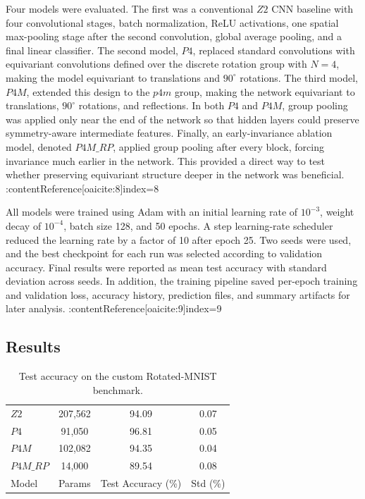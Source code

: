 \documentclass{article}
\begin{document}
Four models were evaluated. The first was a conventional $Z2$ CNN baseline with four convolutional stages, batch normalization, ReLU activations, one spatial max-pooling stage after the second convolution, global average pooling, and a final linear classifier. The second model, $P4$, replaced standard convolutions with equivariant convolutions defined over the discrete rotation group with $N=4$, making the model equivariant to translations and $90^\circ$ rotations. The third model, $P4M$, extended this design to the $p4m$ group, making the network equivariant to translations, $90^\circ$ rotations, and reflections. In both $P4$ and $P4M$, group pooling was applied only near the end of the network so that hidden layers could preserve symmetry-aware intermediate features. Finally, an early-invariance ablation model, denoted $P4M\_RP$, applied group pooling after every block, forcing invariance much earlier in the network. This provided a direct way to test whether preserving equivariant structure deeper in the network was beneficial. :contentReference[oaicite:8]{index=8}

All models were trained using Adam with an initial learning rate of $10^{-3}$, weight decay of $10^{-4}$, batch size 128, and 50 epochs. A step learning-rate scheduler reduced the learning rate by a factor of 10 after epoch 25. Two seeds were used, and the best checkpoint for each run was selected according to validation accuracy. Final results were reported as mean test accuracy with standard deviation across seeds. In addition, the training pipeline saved per-epoch training and validation loss, accuracy history, prediction files, and summary artifacts for later analysis. :contentReference[oaicite:9]{index=9}

\subsection{Results}

\begin{table}[h]
\centering
\caption{Test accuracy on the custom Rotated-MNIST benchmark.}
\label{tab:mnist_results}
\begin{tabular}{lccc}
\hline
$Z2$ & 207{,}562 & 94.09 & 0.07 \\
$P4$ & 91{,}050 & 96.81 & 0.05 \\
$P4M$ & 102{,}082 & 94.35 & 0.04 \\
$P4M\_RP$ & 14{,}000 & 89.54 & 0.08 \\
\hline
Model & Params & Test Accuracy (\%) & Std (\%) \\
\hline
\end{tabular}
\end{table}
\end{document}
